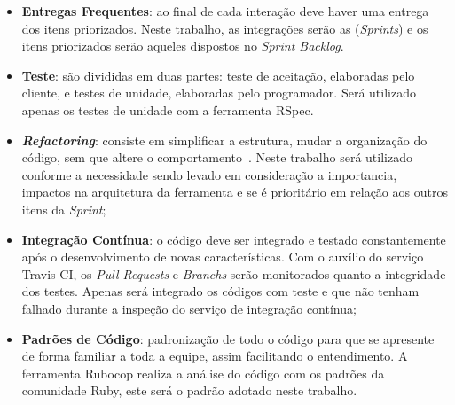 \begin{itemize}
  \item \textbf{Entregas Frequentes}: ao final de cada interação deve haver uma entrega
    dos itens priorizados. Neste trabalho, as integrações serão as (\textit{Sprints})
    e os itens priorizados serão aqueles dispostos no \textit{Sprint Backlog}.
  \item \textbf{Teste}: são divididas em duas partes: teste de aceitação, elaboradas pelo cliente,
    e testes de unidade, elaboradas pelo programador. Será utilizado apenas os testes
    de unidade com a ferramenta RSpec.
  \item \textit{\textbf{Refactoring}}: consiste em simplificar a estrutura, mudar a organização do código,
    sem que altere o comportamento~\cite{beck:2000}. Neste trabalho será utilizado
    conforme a necessidade sendo levado em consideração a importancia, impactos na
    arquitetura da ferramenta e se é prioritário em relação aos outros itens da \textit{Sprint};
  \item \textbf{Integração Contínua}: o código deve ser integrado e testado constantemente
    após o desenvolvimento de novas características. Com o auxílio do serviço Travis CI,
    os \textit{Pull Requests} e \textit{Branchs} serão monitorados quanto a integridade dos testes. Apenas
    será integrado os códigos com teste e que não tenham falhado durante a
    inspeção do serviço de integração contínua;
  \item \textbf{Padrões de Código}: padronização de todo o código para que se apresente
    de forma familiar a toda a equipe, assim facilitando o entendimento. A ferramenta
    Rubocop realiza a análise do código com os padrões da comunidade Ruby, este será
    o padrão adotado neste trabalho.
\end{itemize}


